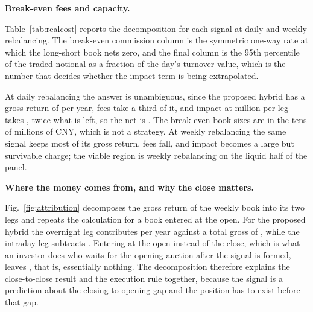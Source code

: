 \documentclass[pdflatex,sn-mathphys-ay]{sn-jnl}
\theoremstyle{thmstyleone}%
\theoremstyle{thmstyletwo}%
\theoremstyle{thmstyletwo}%
\begin{document}
\textbf{Break-even fees and capacity.}

Table~\ref{tab:realcost} reports the decomposition for each signal at daily and weekly rebalancing.
The break-even commission column is the symmetric one-way rate at which the long-short book nets zero,
and the final column is the 95th percentile of the traded notional as a fraction of the day's turnover
value, which is the number that decides whether the impact term is being extrapolated.

\begin{table}[!ht]
	\centering
	\caption{Cost decomposition of the long-short book and the book size at which it breaks even. All figures are annualised percentages except break-even size in million CNY and the 95th percentile of participation. The tradability filter removes a stock on a day when its move on the signal day reaches the price limit, the borrow fee is charged on the short leg, and the impact is evaluated at a reference book of 100 million CNY per leg, from which the other book sizes follow the square-root law.}
	\label{tab:realcost}
	
\end{table}

At daily rebalancing the answer is unambiguous, since the proposed hybrid has a gross return of
\grossDay{} per year, fees take a third of it, and impact at \aumRefM{} million per leg takes
\impactDay, twice what is left, so the net is \netDay. The break-even book sizes are in the tens of
millions of CNY, which is not a strategy. At weekly rebalancing the same signal keeps most of its
gross return, fees fall, and impact becomes a large but survivable charge; the viable region is weekly
rebalancing on the liquid half of the panel.

\textbf{Where the money comes from, and why the close matters.}

Fig.~\ref{fig:attribution} decomposes the gross return of the weekly book
into its two legs and repeats the calculation for a book entered at the open. For the proposed hybrid
the overnight leg contributes \onWkW{} per year against a total gross of \grossWk, while the intraday
leg subtracts \idWk. Entering at the open instead of the close, which is what an investor does who
waits for the opening auction after the signal is formed, leaves \openWk, that is, essentially
nothing. The decomposition therefore explains the close-to-close result and the execution rule
together, because the signal is a prediction about the closing-to-opening gap and the position has to
exist before that gap.
\end{document}
